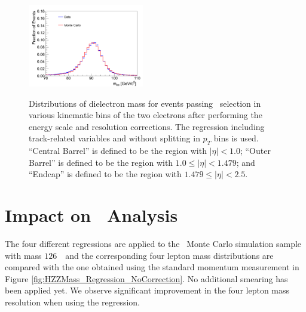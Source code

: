 \documentclass{cmspaper}
\begin{document}
\begin{figure}[h]
{    \includegraphics[width=0.45\textwidth]{figures/ZeeMassScaleAndResolutionValidationPlots_EnergyType2_AfterCorr_CategoryBin4.pdf}
  } 
  \caption{Distributions of dielectron mass for events passing \ZToEE\ selection in various kinematic bins of the
  two electrons after performing the energy scale and resolution corrections. The regression including track-related variables
  and without splitting in $p_{T}$ bins is used. ``Central Barrel'' is defined to be the region with 
  $|\eta| < 1.0$; ``Outer Barrel'' is defined to be the region with $1.0 \le |\eta| < 1.479$; and ``Endcap''
  is defined to be the region with $1.479 \le |\eta| < 2.5$. } 
  \label{fig:ZMassValidation_AfterCorr} 
\end{figure}


\clearpage

\section{Impact on \HiggsToZZToFourL\ Analysis }

The four different regressions are applied to the \HiggsToZZ\ Monte Carlo simulation sample with mass 
$126$~\GeV\ and the corresponding four lepton mass distributions are compared with the one obtained
using the standard momentum measurement in Figure \ref{fig:HZZMass_Regression_NoCorrection}. 
No additional smearing has been applied yet.
We observe significant improvement in the four lepton mass resolution when using the regression.
 
\end{document}
